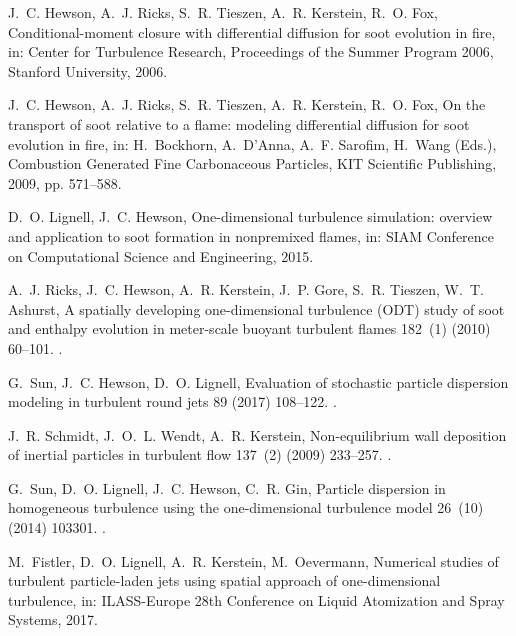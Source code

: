 \documentclass[preprint,12pt, a4paper]{elsarticle}
\begin{document}
\begin{thebibliography}{10}
J.~C. Hewson, A.~J. Ricks, S.~R. Tieszen, A.~R. Kerstein, R.~O. Fox,
  Conditional-moment closure with differential diffusion for soot evolution in
  fire, in: Center for Turbulence Research, Proceedings of the Summer Program
  2006, {Stanford University}, 2006.

J.~C. Hewson, A.~J. Ricks, S.~R. Tieszen, A.~R. Kerstein, R.~O. Fox, On the
  transport of soot relative to a flame: modeling differential diffusion for
  soot evolution in fire, in: H.~Bockhorn, A.~D'Anna, A.~F. Sarofim, H.~Wang
  (Eds.), Combustion Generated Fine Carbonaceous Particles, {KIT Scientific
  Publishing}, 2009, pp. 571--588.

D.~O. Lignell, J.~C. Hewson, One-dimensional turbulence simulation: overview
  and application to soot formation in nonpremixed flames, in: SIAM Conference
  on Computational Science and Engineering, 2015.

A.~J. Ricks, J.~C. Hewson, A.~R. Kerstein, J.~P. Gore, S.~R. Tieszen, W.~T.
  Ashurst, A spatially developing one-dimensional turbulence ({ODT}) study of
  soot and enthalpy evolution in meter-scale buoyant turbulent flames 182~(1)
  (2010) 60--101.
\newblock \href {http://dx.doi.org/10.1080/00102200903297003}
  {}.

G.~Sun, J.~C. Hewson, D.~O. Lignell, Evaluation of stochastic particle
  dispersion modeling in turbulent round jets 89 (2017) 108--122.
\newblock \href {http://dx.doi.org/10.1016/j.ijmultiphaseflow.2016.10.005}
  {}.

J.~R. Schmidt, J.~O.~L. Wendt, A.~R. Kerstein, Non-equilibrium wall deposition
  of inertial particles in turbulent flow 137~(2) (2009) 233--257.
\newblock \href {http://dx.doi.org/10.1007/s10955-009-9844-8}
  {}.

G.~Sun, D.~O. Lignell, J.~C. Hewson, C.~R. Gin, Particle dispersion in
  homogeneous turbulence using the one-dimensional turbulence model 26~(10)
  (2014) 103301.
\newblock \href {http://dx.doi.org/10.1063/1.4896555}
  {}.

M.~Fistler, D.~O. Lignell, A.~R. Kerstein, M.~Oevermann, Numerical studies of
  turbulent particle-laden jets using spatial approach of one-dimensional
  turbulence, in: ILASS-Europe 28th Conference on Liquid Atomization and Spray
  Systems, 2017.


\end{thebibliography}
\end{document}
